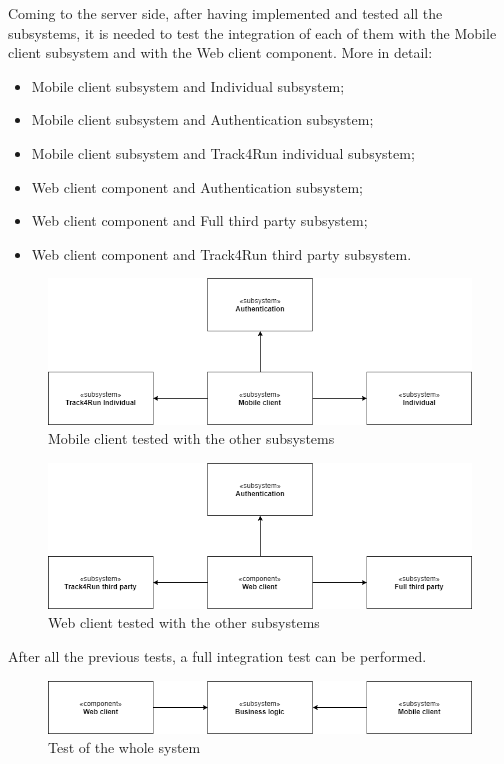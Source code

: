 Coming to the server side, after having implemented and tested all the subsystems, it is needed to test the integration of each of them with the Mobile client subsystem and with the Web client component.
More in detail:
	\begin{itemize}
	\item Mobile client subsystem and Individual subsystem;
	\item Mobile client subsystem and Authentication subsystem;
	\item Mobile client subsystem and Track4Run individual subsystem;
	\item Web client component and Authentication subsystem;
	\item Web client component and Full third party subsystem;
	\item Web client component and Track4Run third party subsystem.
	\end{itemize}
	
	\begin{figure}[H]
	\centering
	\includegraphics[scale=0.5] {images/integration/mobileAndServices.png}
	\caption {Mobile client tested with the other subsystems}
	\end{figure}
	
	\begin{figure}[H]
	\centering
	\includegraphics[scale=0.5] {images/integration/webAndServices.png}
	\caption {Web client tested with the other subsystems}
	\end{figure}
	
	After all the previous tests, a full integration test can be performed.
	
	\begin{figure}[H]
	\centering
	\includegraphics[scale=0.5] {images/integration/general.png}
	\caption {Test of the whole system}
	\end{figure}
	